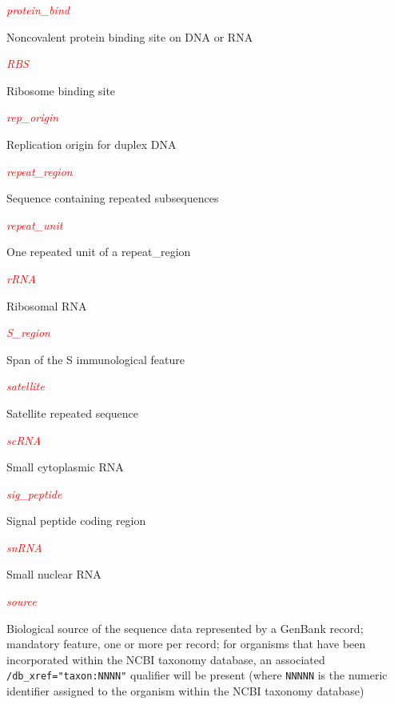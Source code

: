 \textcolor{red}{\textit{protein\_bind}}
\begin{adjustwidth}{1cm}{}
Noncovalent protein binding site on DNA or RNA
\end{adjustwidth}

\textcolor{red}{\textit{RBS}}
\begin{adjustwidth}{1cm}{}
Ribosome binding site
\end{adjustwidth}

\textcolor{red}{\textit{rep\_origin}}
\begin{adjustwidth}{1cm}{}
Replication origin for duplex DNA
\end{adjustwidth}

\textcolor{red}{\textit{repeat\_region}}
\begin{adjustwidth}{1cm}{}
Sequence containing repeated subsequences
\end{adjustwidth}

\textcolor{red}{\textit{repeat\_unit}}
\begin{adjustwidth}{1cm}{}
One repeated unit of a repeat\_region
\end{adjustwidth}

\textcolor{red}{\textit{rRNA}}
\begin{adjustwidth}{1cm}{}
Ribosomal RNA
\end{adjustwidth}

\textcolor{red}{\textit{S\_region}}
\begin{adjustwidth}{1cm}{}
Span of the S immunological feature
\end{adjustwidth}

\textcolor{red}{\textit{satellite}}
\begin{adjustwidth}{1cm}{}
Satellite repeated sequence
\end{adjustwidth}

\textcolor{red}{\textit{scRNA}}
\begin{adjustwidth}{1cm}{}
Small cytoplasmic RNA
\end{adjustwidth}

\textcolor{red}{\textit{sig\_peptide}}
\begin{adjustwidth}{1cm}{}
Signal peptide coding region
\end{adjustwidth}

\textcolor{red}{\textit{snRNA}}
\begin{adjustwidth}{1cm}{}
Small nuclear RNA
\end{adjustwidth}

\textcolor{red}{\textit{source}}
\begin{adjustwidth}{1cm}{}
Biological source of the sequence data represented by a GenBank record; mandatory feature, one or more per record; for organisms that have been incorporated within the NCBI taxonomy database, an associated \verb|/db_xref="taxon:NNNN"| qualifier will be present (where \verb|NNNNN| is the numeric identifier assigned to the organism within the NCBI taxonomy database) 
\end{adjustwidth}

